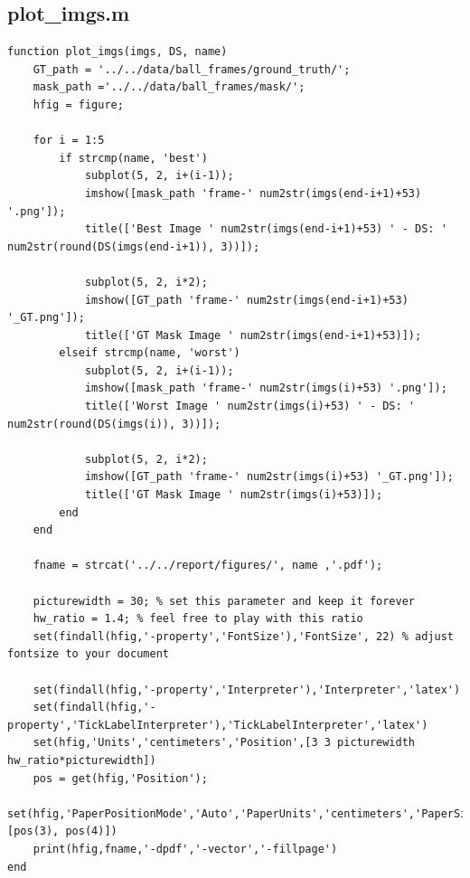 \documentclass[conference]{IEEEtran}
\begin{document}
        \subsection{plot\_imgs.m}
            \begin{lstlisting}[style=Matlab-editor, basicstyle=\scriptsize]
function plot_imgs(imgs, DS, name)
    GT_path = '../../data/ball_frames/ground_truth/';
    mask_path ='../../data/ball_frames/mask/';
    hfig = figure;

    for i = 1:5
        if strcmp(name, 'best')
            subplot(5, 2, i+(i-1));
            imshow([mask_path 'frame-' num2str(imgs(end-i+1)+53) '.png']);
            title(['Best Image ' num2str(imgs(end-i+1)+53) ' - DS: ' num2str(round(DS(imgs(end-i+1)), 3))]);

            subplot(5, 2, i*2);
            imshow([GT_path 'frame-' num2str(imgs(end-i+1)+53) '_GT.png']);
            title(['GT Mask Image ' num2str(imgs(end-i+1)+53)]);
        elseif strcmp(name, 'worst')
            subplot(5, 2, i+(i-1));
            imshow([mask_path 'frame-' num2str(imgs(i)+53) '.png']);
            title(['Worst Image ' num2str(imgs(i)+53) ' - DS: ' num2str(round(DS(imgs(i)), 3))]);

            subplot(5, 2, i*2);
            imshow([GT_path 'frame-' num2str(imgs(i)+53) '_GT.png']);
            title(['GT Mask Image ' num2str(imgs(i)+53)]);
        end
    end

    fname = strcat('../../report/figures/', name ,'.pdf');

    picturewidth = 30; % set this parameter and keep it forever
    hw_ratio = 1.4; % feel free to play with this ratio
    set(findall(hfig,'-property','FontSize'),'FontSize', 22) % adjust fontsize to your document

    set(findall(hfig,'-property','Interpreter'),'Interpreter','latex') 
    set(findall(hfig,'-property','TickLabelInterpreter'),'TickLabelInterpreter','latex')
    set(hfig,'Units','centimeters','Position',[3 3 picturewidth hw_ratio*picturewidth])
    pos = get(hfig,'Position');
    set(hfig,'PaperPositionMode','Auto','PaperUnits','centimeters','PaperSize',[pos(3), pos(4)])
    print(hfig,fname,'-dpdf','-vector','-fillpage')
end
            \end{lstlisting}
\end{document}
